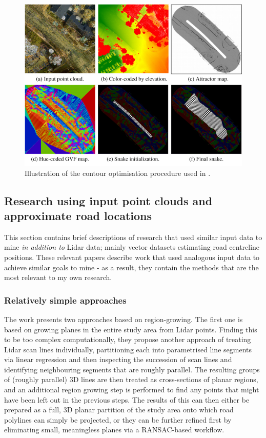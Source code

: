 \begin{figure}[h]
    \centering
    \includegraphics[width=0.75\linewidth]{final_report/figs/boyko_funkahuser_2011_01.png} 
    \caption{Illustration of the contour optimisation procedure used in \cite{boyko_funkhauser_2011}.}
    \label{fig:boykofunkhauser2011}
\end{figure}

\subsection{Research using input point clouds and approximate road locations}
\label{sub:lidaraccuracy_external}

This section contains brief descriptions of research that used similar input data to mine \textit{in addition to} Lidar data; mainly vector datasets estimating road centreline positions. These relevant papers describe work that used analogous input data to achieve similar goals to mine - as a result, they contain the methods that are the most relevant to my own research.

\subsubsection{Relatively simple approaches}

The work \cite{hatger_brenner_2003} presents two approaches based on region-growing. The first one is based on growing planes in the entire study area from Lidar points. Finding this to be too complex computationally, they propose another approach of treating Lidar scan lines individually, partitioning each into parametrised line segments via linear regression and then inspecting the succession of scan lines and identifying neighbouring segments that are roughly parallel. The resulting groups of (roughly parallel) 3D lines are then treated as cross-sections of planar regions, and an additional region growing step is performed to find any points that might have been left out in the previous steps. The results of this can then either be prepared as a full, 3D planar partition of the study area onto which road polylines can simply be projected, or they can be further refined first by eliminating small, meaningless planes via a RANSAC-based workflow.

